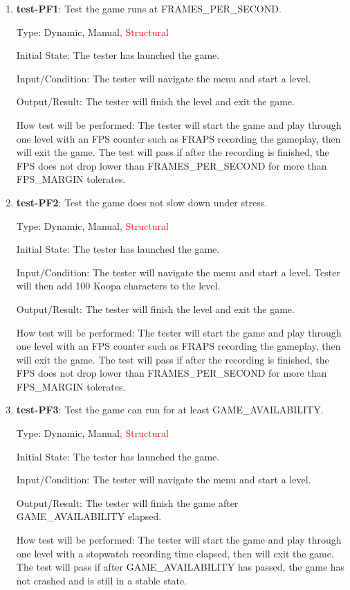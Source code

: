 \documentclass[12pt, titlepage]{article}
\begin{document}
\begin{enumerate}

\item{\textbf{test-PF1}: Test the game runs at FRAMES\_PER\_SECOND.\\}

Type: Dynamic, Manual\textcolor{red}{, Structural}

Initial State: The tester has launched the game.

Input/Condition: The tester will navigate the menu and start a level.

Output/Result: The tester will finish the level and exit the game.

How test will be performed: The tester will start the game and play through one level with an FPS counter such as FRAPS recording the gameplay, then will exit the game. The test will pass if after the recording is finished, the FPS does not drop lower than FRAMES\_PER\_SECOND for more than FPS\_MARGIN tolerates.

\item{\textbf{test-PF2}: Test the game does not slow down under stress.\\}

Type: Dynamic, Manual\textcolor{red}{, Structural}

Initial State: The tester has launched the game.

Input/Condition: The tester will navigate the menu and start a level. Tester will then add 100 Koopa characters to the level.

Output/Result: The tester will finish the level and exit the game.

How test will be performed: The tester will start the game and play through one level with an FPS counter such as FRAPS recording the gameplay, then will exit the game. The test will pass if after the recording is finished, the FPS does not drop lower than FRAMES\_PER\_SECOND for more than FPS\_MARGIN tolerates.


\item{\textbf{test-PF3}: Test the game can run for at least GAME\_AVAILABILITY.\\}

Type: Dynamic, Manual\textcolor{red}{, Structural}

Initial State: The tester has launched the game.

Input/Condition: The tester will navigate the menu and start a level.

Output/Result: The tester will finish the game after GAME\_AVAILABILITY elapsed.

How test will be performed: The tester will start the game and play through one level with a stopwatch recording time elapsed, then will exit the game. The test will pass if after GAME\_AVAILABILITY has passed, the game has not crashed and is still in a stable state.
\end{enumerate}
\end{document}
